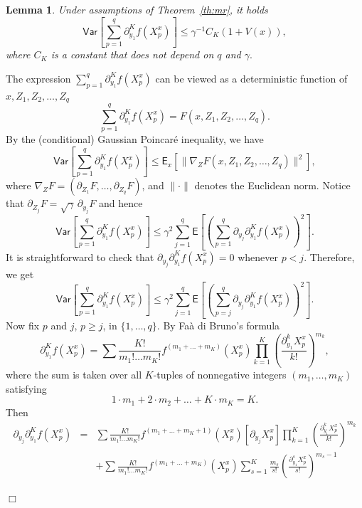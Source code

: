 \documentclass[bj]{imsart}
\newcommand{\proofendsign}{$\Box$}
\newtheorem{lem}[thm]{Lemma}
\newenvironment{proof}{{\noindent \bf Proof }}
 {{\hspace*{\fill}\proofendsign\par\bigskip}}
\begin{document}
\begin{lem}
\label{lem:var_poincare}
Under assumptions of Theorem~\ref{th:mr}, it holds
$$
\mathsf{Var}\left[\sum_{p=1}^{q}\partial_{y_{1}}^{K}f\left(X_{p}^x\right)\right]\le  \gamma^{-1} C_K (1+V(x)),
$$
where $C_K$ is a constant that does not depend on $q$ and $\gamma.$ 
\end{lem}
\begin{proof}
The expression
$\sum_{p=1}^q \partial_{y_1}^K f(X_p^x)$
can be viewed as a deterministic function of
$x,Z_1,Z_{2},\ldots,Z_q$
$$
\sum_{p=1}^q  \partial_{y_1}^K f(X_p^x)
=F(x,Z_1,Z_{2},\ldots,Z_q).
$$
By the (conditional) Gaussian Poincar\'e inequality,
we have
$$
\mathsf{Var}\left[\sum_{p=1}^{q}\partial_{y_{1}}^{K}f\left(X_{p}^x\right)\right]
\le\mathsf E_x\left[
\|\nabla_Z F(x,Z_1,Z_{2},\ldots,Z_q)\|^2
\right],
$$
where $\nabla_Z F=(\partial_{Z_1} F,\ldots,\partial_{Z_q} F)$,
and $\|\cdot\|$ denotes the Euclidean norm.
Notice that \(\partial_{Z_j} F=\sqrt{\gamma}\,\partial_{y_j} F\) and
hence
$$
\mathsf{Var}\left[\sum_{p=1}^{q}\partial_{y_{1}}^{K}f\left(X_{p}^x\right)\right]\leq\gamma^2\sum_{j=1}^{q}\mathsf{E}\left[\left(\sum_{p=1}^{q}\partial_{y_{j}}\partial_{y_{1}}^{K}f\left(X_{p}^x\right)\right)^{2}\right].
$$
It is straightforward to check that
$\partial_{y_j}\partial_{y_1}^K f(X_p^x)=0$
whenever $p<j$. Therefore, we get
\begin{equation}\label{eq:10062018a2}
\mathsf{Var}\left[\sum_{p=1}^{q}\partial_{y_{1}}^{K}f\left(X_{p}^x\right)\right]\leq\gamma^2\sum_{j=1}^{q}\mathsf{E}\left[\left(\sum_{p=j}^{q}\partial_{y_{j}}\partial_{y_{1}}^{K}f\left(X_{p}^x\right)\right)^{2}\right].
\end{equation}
Now fix $p$ and $j$, $p\ge j$, in $\{1,\ldots,q\}$.
By Fa\`a di Bruno's formula
\[
\partial_{y_{1}}^{K}f\left(X_{p}^x\right)=\sum\frac{K!}{m_{1}!\ldots m_{K}!}f^{(m_{1}+\ldots+m_{K})}(X_{p}^x)\prod_{k=1}^{K}\left(\frac{\partial_{y_{1}}^{k}X^x_{p}}{k!}\right)^{m_{k}},
\]
where the sum is taken over all $K$-tuples of nonnegative integers
$(m_1,\ldots,m_K)$ satisfying
$$
1\cdot m_{1}+2\cdot m_{2}+\ldots+K\cdot m_{K}=K.
$$
Then
\begin{eqnarray*}
\partial_{y_{j}}\partial_{y_{1}}^{K}f\left(X_{p}^x\right)
&=&\sum\frac{K!}{m_{1}!\ldots m_{K}!}f^{(m_{1}+\ldots+m_{K}+1)}(X^x_{p})\left[\partial_{y_{j}}X^x_{p}\right]\prod_{k=1}^{K}\left(\frac{\partial_{y_{1}}^{k}X_{p}^x}{k!}\right)^{m_{k}} \\
&&+\sum\frac{K!}{m_{1}!\ldots m_{K}!}f^{(m_{1}+\ldots+m_{K})}(X^x_{p})
\sum_{s=1}^{K}\frac{m_{s}}{s!}
\left(\frac{\partial_{y_{1}}^{s}X^x_{p}}{s!}\right)^{m_{s}-1}

\end{eqnarray*}
\end{proof}
\end{document}
